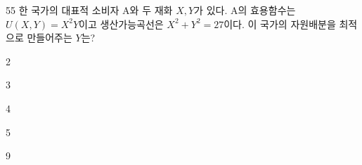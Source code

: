 \begin{question}{55}
한 국가의 대표적 소비자 A와 두 재화 $X, Y$가 있다. A의 효용함수는 $U(X,Y)=X^{2}Y$이고 생산가능곡선은 $X^{2}+Y^{2}=27$이다. 이 국가의 자원배분을 최적으로 만들어주는 $Y$는?
\begin{choices}
  \item 2
  \item 3
  \item 4
  \item 5
  \item 9
\end{choices}
\end{question}
